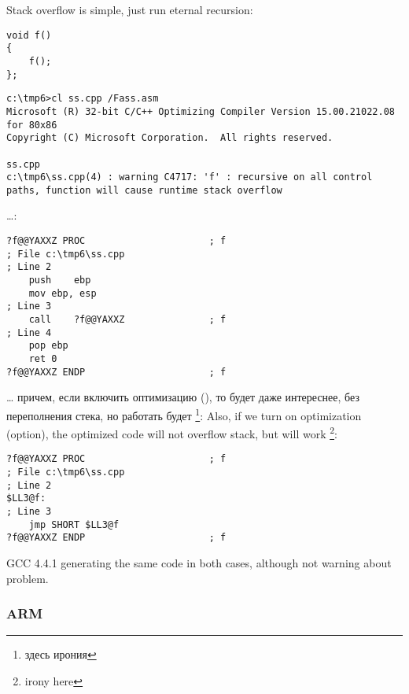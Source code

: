 \index{\Recursion}
{Stack overflow is simple, just run eternal recursion:}

\begin{lstlisting}
void f()
{
	f();
};
\end{lstlisting}


\begin{lstlisting}
c:\tmp6>cl ss.cpp /Fass.asm
Microsoft (R) 32-bit C/C++ Optimizing Compiler Version 15.00.21022.08 for 80x86
Copyright (C) Microsoft Corporation.  All rights reserved.

ss.cpp
c:\tmp6\ss.cpp(4) : warning C4717: 'f' : recursive on all control paths, function will cause runtime stack overflow
\end{lstlisting}

\dots {}:

\begin{lstlisting}
?f@@YAXXZ PROC						; f
; File c:\tmp6\ss.cpp
; Line 2
	push	ebp
	mov	ebp, esp
; Line 3
	call	?f@@YAXXZ				; f
; Line 4
	pop	ebp
	ret	0
?f@@YAXXZ ENDP						; f
\end{lstlisting}

\dots \IFRU
{причем, если включить оптимизацию (\Ox), то будет даже интереснее, без переполнения стека, 
но работать будет \footnote{здесь ирония}:}
{Also, if we turn on optimization (\Ox option), the optimized code will not overflow stack, 
but will work \footnote{irony here}:}

\begin{lstlisting}
?f@@YAXXZ PROC						; f
; File c:\tmp6\ss.cpp
; Line 2
$LL3@f:
; Line 3
	jmp	SHORT $LL3@f
?f@@YAXXZ ENDP						; f
\end{lstlisting}

{GCC 4.4.1 generating the same code in both cases, although not warning about problem.}

\subsubsection{ARM}

